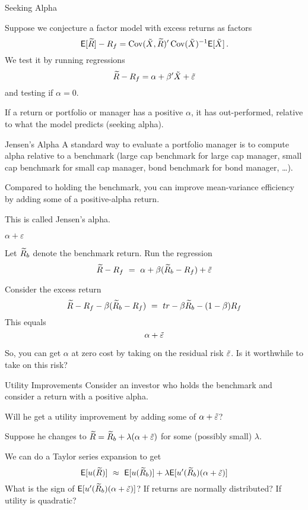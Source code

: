\begin{frame}{Seeking Alpha}

Suppose we conjecture a factor model with excess returns as factors
$$\mathsf{E}[\widetilde{R}] - R_f =  \operatorname{Cov}(\tilde{X},\widetilde{R})'\operatorname{Cov}(\tilde{X})^{-1}\mathsf{E}[\tilde{X}]\,.$$
We test it by running regressions
$$\widetilde{R} - R_f = \alpha + \beta'\tilde{X} + \tilde{\varepsilon}$$
and testing if $\alpha=0$.

If a return or portfolio or manager has a positive $\alpha$, it has out-performed, relative to what the model predicts (seeking alpha).
\end{frame}


\begin{frame}{Jensen's Alpha}
A standard way to evaluate a portfolio manager is to compute alpha relative to a benchmark (large cap benchmark for large cap manager, small cap benchmark for small cap manager, bond benchmark for bond manager, \ldots).

Compared to holding the benchmark, you can improve mean-variance efficiency by adding some of a positive-alpha return.  

This is called Jensen's alpha.
\end{frame}


\begin{frame}{$\alpha + \varepsilon$ }

Let $\widetilde{R}_b$ denote the benchmark return.  Run the regression
$$\tr - R_f \ = \ \alpha + \beta (\tr_b-R_f) + \tve$$

Consider the excess return
$$\widetilde{R} - R_f -\beta (\widetilde{R}_b-R_f) \ = \ tr - \beta \widetilde{R}_b - (1-\beta)R_f$$
This equals
$$\alpha + \tilde{\varepsilon}$$

So, you can get $\alpha$ at zero cost by taking on the residual risk $\tilde{\varepsilon}$.  Is it worthwhile to take on this risk?

\end{frame}


\begin{frame}{Utility Improvements}
Consider an investor who holds the benchmark and consider a return with a positive alpha.

Will he get a utility improvement by adding some of $\alpha + \tilde{\varepsilon}$?  

Suppose he changes to $\widetilde{R} = \widetilde{R}_b + \lambda(\alpha+\tilde{\varepsilon})$ for some (possibly small) $\lambda$.

We can do a Taylor series expansion to get
$$\mathsf{E}[u(\widetilde{R})] \ \approx \ \mathsf{E}[u(\widetilde{R}_b)] + \lambda \mathsf{E}[u'(\widetilde{R}_b)(\alpha+\tilde{\varepsilon})]$$
What is the sign of $\mathsf{E}[u'(\widetilde{R}_b)(\alpha+\tilde{\varepsilon})]$?
\bi
\im If returns are normally distributed?
\im If utility is quadratic?
\ei
\end{frame}

